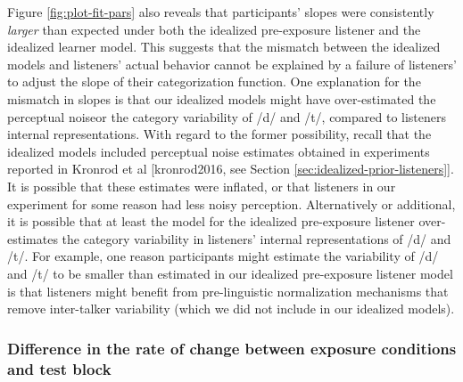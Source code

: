 \documentclass[
  11pt,
  man,mask,floatsintext]{apa6}
\begin{document}
Figure \ref{fig:plot-fit-pars} also reveals that participants' slopes were consistently \emph{larger} than expected under both the idealized pre-exposure listener and the idealized learner model. This suggests that the mismatch between the idealized models and listeners' actual behavior cannot be explained by a failure of listeners' to adjust the slope of their categorization function. One explanation for the mismatch in slopes is that our idealized models might have over-estimated the perceptual noiseor the category variability of /d/ and /t/, compared to listeners internal representations. With regard to the former possibility, recall that the idealized models included perceptual noise estimates obtained in experiments reported in Kronrod et al {[}kronrod2016, see Section \ref{sec:idealized-prior-listeners}{]}. It is possible that these estimates were inflated, or that listeners in our experiment for some reason had less noisy perception. Alternatively or additional, it is possible that at least the model for the idealized pre-exposure listener over-estimates the category variability in listeners' internal representations of /d/ and /t/. For example, one reason participants might estimate the variability of /d/ and /t/ to be smaller than estimated in our idealized pre-exposure listener model is that listeners might benefit from pre-linguistic normalization mechanisms that remove inter-talker variability (which we did not include in our idealized models).

\subsubsection{Difference in the rate of change between exposure conditions and test block}\label{difference-in-the-rate-of-change-between-exposure-conditions-and-test-block}
\end{document}
